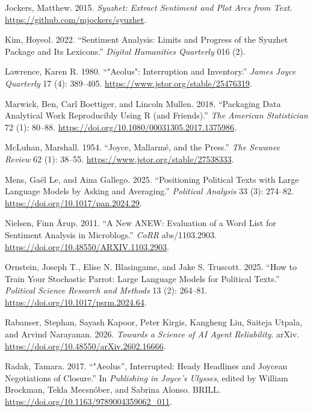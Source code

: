 \documentclass[
  letterpaper,
  DIV=11,
  numbers=noendperiod]{scrartcl}
\newlength{\cslhangindent}
\newenvironment{CSLReferences}[2] %
 {\begin{list}{}{%
  \setlength{\itemindent}{0pt}
  \setlength{\leftmargin}{0pt}
  \setlength{\parsep}{0pt}
  \ifodd #1
   \setlength{\leftmargin}{\cslhangindent}
   \setlength{\itemindent}{-1\cslhangindent}
  \fi
  \setlength{\itemsep}{#2\baselineskip}}}
 {\end{list}}
\begin{document}
\begin{CSLReferences}{1}{1}
Jockers, Matthew. 2015. \emph{Syuzhet: {Extract} {Sentiment} and {Plot}
{Arcs} from {Text}}. \url{https://github.com/mjockers/syuzhet}.

Kim, Hoyeol. 2022. {``Sentiment {Analysis}: {Limits} and {Progress} of
the {Syuzhet} {Package} and {Its} {Lexicons}.''} \emph{Digital
Humanities Quarterly} 016 (2).

Lawrence, Karen R. 1980. {``"{Aeolus}": {Interruption} and
{Inventory}.''} \emph{James Joyce Quarterly} 17 (4): 389--405.
\url{https://www.jstor.org/stable/25476319}.

Marwick, Ben, Carl Boettiger, and Lincoln Mullen. 2018. {``Packaging
{Data} {Analytical} {Work} {Reproducibly} {Using} {R} (and
{Friends}).''} \emph{The American Statistician} 72 (1): 80--88.
\url{https://doi.org/10.1080/00031305.2017.1375986}.

McLuhan, Marshall. 1954. {``Joyce, {Mallarmé}, and the {Press}.''}
\emph{The Sewanee Review} 62 (1): 38--55.
\url{https://www.jstor.org/stable/27538333}.

Mens, Gaël Le, and Aina Gallego. 2025. {``Positioning {Political}
{Texts} with {Large} {Language} {Models} by {Asking} and {Averaging}.''}
\emph{Political Analysis} 33 (3): 274--82.
\url{https://doi.org/10.1017/pan.2024.29}.

Nielsen, Finn Årup. 2011. {``A New {ANEW}: {Evaluation} of a Word List
for Sentiment Analysis in Microblogs.''} \emph{CoRR} abs/1103.2903.
\url{https://doi.org/10.48550/ARXIV.1103.2903}.

Ornstein, Joseph T., Elise N. Blasingame, and Jake S. Truscott. 2025.
{``How to Train Your Stochastic Parrot: Large Language Models for
Political Texts.''} \emph{Political Science Research and Methods} 13
(2): 264--81. \url{https://doi.org/10.1017/psrm.2024.64}.

Rabanser, Stephan, Sayash Kapoor, Peter Kirgis, Kangheng Liu, Saiteja
Utpala, and Arvind Narayanan. 2026. \emph{Towards a {Science} of {AI}
{Agent} {Reliability}}. arXiv.
\url{https://doi.org/10.48550/arXiv.2602.16666}.

Radak, Tamara. 2017. {``"{Aeolus}'', {Interrupted}: {Heady} {Headlines}
and {Joycean} {Negotiations} of {Closure}.''} In \emph{Publishing in
{Joyce}'s \emph{Ulysses}}, edited by William Brockman, Tekla Mecsnóber,
and Sabrina Alonso. BRILL.
\url{https://doi.org/10.1163/9789004359062_011}.


\end{CSLReferences}
\end{document}
